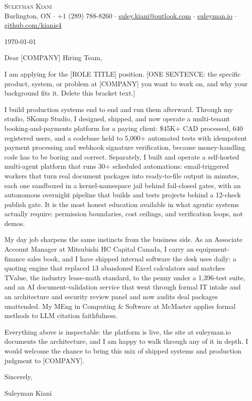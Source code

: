 \documentclass[letterpaper,11pt]{article}
\newcommand{\company}{[COMPANY]}
\newcommand{\role}{[ROLE TITLE]}
\newcommand{\hook}{[ONE SENTENCE: the specific product, system, or problem at \company{} you want to work on, and why your background fits it. Delete this bracket text.]}
\begin{document}
\begin{center}
    {\Huge \scshape Suleyman Kiani} \\ \vspace{3pt}
    \small Burlington, ON $\cdot$ +1 (289) 788-8260 $\cdot$ \href{mailto:suley.kiani@outlook.com}{\underline{suley.kiani@outlook.com}} $\cdot$ \href{https://suleyman.io}{\underline{suleyman.io}} $\cdot$ \href{https://github.com/kianis4}{\underline{github.com/kianis4}}
\end{center}

\vspace{8pt}
\today

Dear \company{} Hiring Team,

I am applying for the \role{} position. \hook{}

I build production systems end to end and run them afterward. Through my studio, SKomp Studio, I designed, shipped, and now operate a multi-tenant booking-and-payments platform for a paying client: \$45K+ CAD processed, 640 registered users, and a codebase held to 5,000+ automated tests with idempotent payment processing and webhook signature verification, because money-handling code has to be boring and correct. Separately, I built and operate a self-hosted multi-agent platform that runs 30+ scheduled automations: email-triggered workers that turn real document packages into ready-to-file output in minutes, each one sandboxed in a kernel-namespace jail behind fail-closed gates, with an autonomous overnight pipeline that builds and tests projects behind a 12-check publish gate. It is the most honest education available in what agentic systems actually require: permission boundaries, cost ceilings, and verification loops, not demos.

My day job sharpens the same instincts from the business side. As an Associate Account Manager at Mitsubishi HC Capital Canada, I carry an equipment-finance sales book, and I have shipped internal software the desk uses daily: a quoting engine that replaced 13 abandoned Excel calculators and matches TValue, the industry lease-math standard, to the penny under a 1,396-test suite, and an AI document-validation service that went through formal IT intake and an architecture and security review panel and now audits deal packages unattended. My MEng in Computing \& Software at McMaster applies formal methods to LLM citation faithfulness.

Everything above is inspectable: the platform is live, the site at suleyman.io documents the architecture, and I am happy to walk through any of it in depth. I would welcome the chance to bring this mix of shipped systems and production judgment to \company{}.

Sincerely,

Suleyman Kiani
\end{document}
